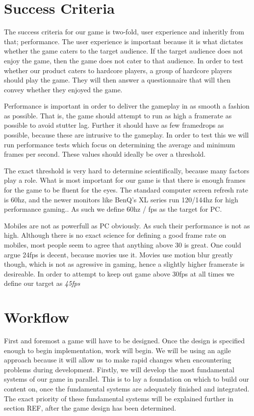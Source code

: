 \section{Success Criteria}\label{successcriteria}
The success criteria for our game is two-fold, user experience and inheritly from that; performance.
The user experience is important because it is what dictates whether the game caters to the target audience.
If the target audience does not enjoy the game, then the game does not cater to that audience.
In order to test whether our product caters to hardcore players, a group of hardcore players should play the game.
They will then answer a questionnaire that will then convey whether they enjoyed the game.

Performance is important in order to deliver the gameplay in as smooth a fashion as possible. That is, the game should attempt to run as high a framerate as possible to avoid stutter lag. Further it should have as few framedrops as possible, because these are intrusive to the gameplay. In order to test this we will run performance tests which focus on determining the average and minimum frames per second. These values should ideally be over a threshold. 

The exact threshold is very hard to determine scientifically, because many factors play a role. What is most important for our game is that there is enough frames for the game to be fluent for the eyes. The standard computer screen refresh rate is 60hz, and the newer monitors like BenQ's XL series run 120/144hz for high performance gaming.\cite{benq}. As such we define 60hz / fps as the target for PC.

Mobiles are not as powerfull as PC obviously. As such their performance is not as high. Although there is no exact science for defining a good frame rate on mobiles, most people seem to agree that anything above 30 is great. One could argue 24fps is decent, because movies use it. Movies use motion blur greatly though, which is not as agressive in gaming, hence a slightly higher framerate is desireable.\cite{mobilefpsone}\cite{mobilefpstwo} 
In order to attempt to keep out game above 30fps at all times we define our target as \emph{45fps}

\section{Workflow}
First and foremost a game will have to be designed.
Once the design is specified enough to begin implementation, work will begin.
We will be using an agile approach because it will allow us to make rapid changes when encountering problems during development.
Firstly, we will develop the most fundamental systems of our game in parallel.
This is to lay a foundation on which to build our content on, once the fundamental systems are adequately finished and integrated.
The exact priority of these fundamental systems will be explained further in section  REF, after the game design has been determined.	